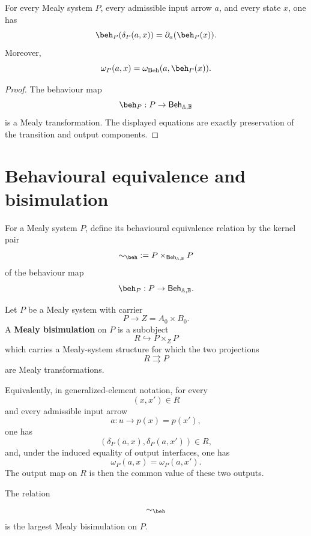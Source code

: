 \begin{proposition}
\label{prop:behaviour-maps-preserve-derivatives}
For every Mealy system \(P\), every admissible input arrow \(a\), and every
state \(x\), one has
\[
\beh_P(\delta_P(a,x))
=
\partial_a(\beh_P(x)).
\]
Moreover,
\[
\omega_P(a,x)
=
\omega_{\mathrm{Beh}}(a,\beh_P(x)).
\]
\end{proposition}

\begin{proof}
The behaviour map
\[
\beh_P:P\to\mathsf{Beh}_{\mathbb A,\mathbb B}
\]
is a Mealy transformation. The displayed equations are exactly preservation
of the transition and output components.
\end{proof}

\section{Behavioural equivalence and bisimulation}
\label{sec:behavioural-equivalence-bisimulation}

\begin{definition}
\label{def:behavioural-equivalence}
For a Mealy system \(P\), define its behavioural equivalence relation by the
kernel pair
\[
{\sim_{\beh}}
:=
P\times_{\mathsf{Beh}_{\mathbb A,\mathbb B}}P
\]
of the behaviour map
\[
\beh_P:P\to\mathsf{Beh}_{\mathbb A,\mathbb B}.
\]
\end{definition}

\begin{definition}
\label{def:mealy-bisimulation}
Let \(P\) be a Mealy system with carrier
\[
P\to Z=A_0\times B_0.
\]
A \textbf{Mealy bisimulation} on \(P\) is a subobject
\[
R\hookrightarrow P\times_ZP
\]
which carries a Mealy-system structure for which the two projections
\[
R\rightrightarrows P
\]
are Mealy transformations.

Equivalently, in generalized-element notation, for every
\[
(x,x')\in R
\]
and every admissible input arrow
\[
a:u\to p(x)=p(x'),
\]
one has
\[
(\delta_P(a,x),\delta_P(a,x'))\in R,
\]
and, under the induced equality of output interfaces, one has
\[
\omega_P(a,x)=\omega_P(a,x').
\]
The output map on \(R\) is then the common value of these two outputs.
\end{definition}

\begin{theorem}
\label{thm:behavioural-equivalence-largest-bisimulation}
The relation
\[
{\sim_{\beh}}
\]
is the largest Mealy bisimulation on \(P\).
\end{theorem}

